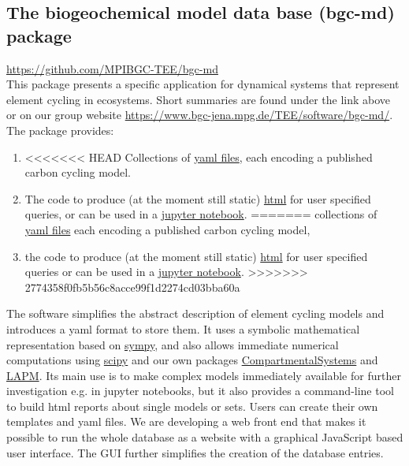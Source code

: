 \documentclass[a4paper]{article}
\begin{document}
\subsection{The biogeochemical model data base (bgc-md) package}
\url{https://github.com/MPIBGC-TEE/bgc-md}\\
This package presents a specific application for dynamical systems that represent element cycling in ecosystems.
Short summaries are found under the link above or on our group website \url{https://www.bgc-jena.mpg.de/TEE/software/bgc-md/}.
The package provides: 
\begin{enumerate} 
	\item
<<<<<<< HEAD
	Collections of \href{https://github.com/MPIBGC-TEE/bgc-md/tree/master/bgc_md/data/all_records}{yaml files}, each encoding a published carbon cycling model.  
	
	\item 
		The code to produce (at the moment still static) \href{https://www.bgc-jena.mpg.de/TEE/software/bgc-md/vegetation/list_report_v.html}{html} for user specified queries, or can be used in a \href{https://github.com/MPIBGC-TEE/bgc-md/blob/master/jupyter_notebooks/Examples/how_to_apply_toolkit_to_yaml_model.ipynb}{jupyter notebook}. 
=======
	collections of \href{https://github.com/MPIBGC-TEE/bgc-md/tree/master/bgc_md/data/all_records}{yaml files} each encoding a published carbon cycling model,
	
	\item 
	the code to produce (at the moment still static) \href{https://www.bgc-jena.mpg.de/TEE/software/bgc-md/vegetation/list_report_v.html}{html} for user specified queries or can be used in a \href{https://github.com/MPIBGC-TEE/bgc-md/blob/master/jupyter_notebooks/Examples/how_to_apply_toolkit_to_yaml_model.ipynb}{jupyter notebook}. 
>>>>>>> 2774358f0fb5b56c8acce99f1d2274cd03bba60a
\end{enumerate} 
The software simplifies the abstract description of element cycling models and introduces a yaml format to store them. It uses a symbolic mathematical representation based on \href{http://www.sympy.org/en/index.htmlhttp://www.sympy.org/en/index.html}{sympy}, and also allows immediate numerical computations using \href{https://scipy.org/}{scipy} and our own packages \href{https://github.com/MPIBGC-TEE/CompartmentalSystems}{CompartmentalSystems} and \href{https://github.com/MPIBGC-TEE/LAPM}{LAPM}. 
Its main use is to make complex models immediately available for further investigation e.g. in jupyter notebooks, but it also provides a command-line tool to build html reports about single models or sets. Users can create their own templates and yaml files.
We are developing a web front end that makes it possible to run the whole database as a website with a graphical JavaScript based user interface. The GUI further simplifies the creation of the database entries. 
\end{document}
